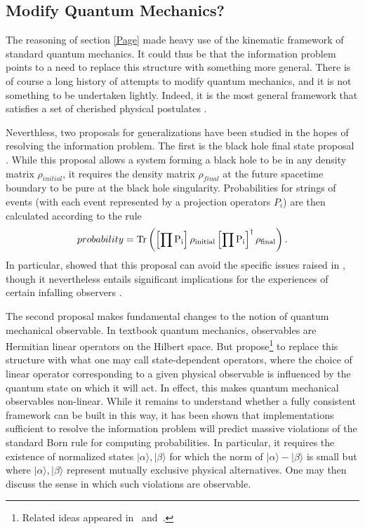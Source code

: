 \documentclass[10pt]{article}
\begin{document}
\subsection{Modify Quantum Mechanics?}
\label{MQM}


The reasoning of section \ref{Page} made heavy use of the kinematic framework of standard quantum mechanics.  It could thus be that the information problem points to a need to replace this structure with something more general.  There is of course a long history of attempts to modify quantum mechanics, and it is not something to be undertaken lightly. Indeed, it is the most general framework that satisfies a set of cherished physical postulates \cite{Kapustin:2013yda}.

Neverthless, two proposals for generalizations have been studied in the hopes of resolving the information problem. The first is the black hole final state proposal \cite{Horowitz:2003he}.  While this proposal allows a system forming a black hole to be in any density matrix $\rho_{initial}$, it requires the density matrix $\rho_{final}$ at the future spacetime boundary to be pure at the black hole singularity.  Probabilities for strings of events (with each event represented by a projection operators $P_{i}$) are then calculated according to the rule
\begin{equation}
probability = \rm{Tr} \left(\left[\prod P_i \right]\rho_{initial} \left[\prod P_i \right]^\dagger \rho_{final} \right).
\end{equation}
In particular, \cite{Lloyd:2013bza} showed that this proposal can avoid the specific issues raised in \cite{Almheiri:2012rt,Almheiri:2013hfa}, though it nevertheless entails significant implications for the experiences of certain infalling observers \cite{Lloyd:2013bza,Bousso:2013uka}.

The second proposal makes fundamental changes to the notion of quantum mechanical observable.  In textbook quantum mechanics, observables are Hermitian linear operators on the Hilbert space.  But \cite{Papadodimas:2012aq,Papadodimas:2013wnh,Papadodimas:2013jku,Papadodimas:2013kwa,Papadodimas:2015xma,Papadodimas:2015jra} propose\footnote{Related ideas
appeared in~\cite{Nomura:2012sw,Nomura:2013gna,Nomura:2012ex} and~\cite{Verlinde:2012cy,Verlinde:2013uja,Verlinde:2013vja,Verlinde:2013qya}.} to replace this structure with what one may call state-dependent operators, where the choice of linear operator corresponding to a given physical observable is influenced by the quantum state on which it will act.  In effect, this makes quantum mechanical observables non-linear.  While it remains to understand whether a fully consistent framework can be built in this way, it has been shown \cite{Marolf:2015dia} that implementations sufficient to resolve the information problem will predict massive violations of the standard Born rule for computing probabilities.  In particular, it requires the existence of normalized states  $|\alpha \rangle, |\beta \rangle$ for which the norm of $|\alpha \rangle - |\beta \rangle$ is small but where $|\alpha \rangle, |\beta \rangle$ represent mutually exclusive physical alternatives.  One may then discuss \cite{Marolf:2015dia,Raju:2016vsu} the sense in which such violations are observable.
\end{document}
